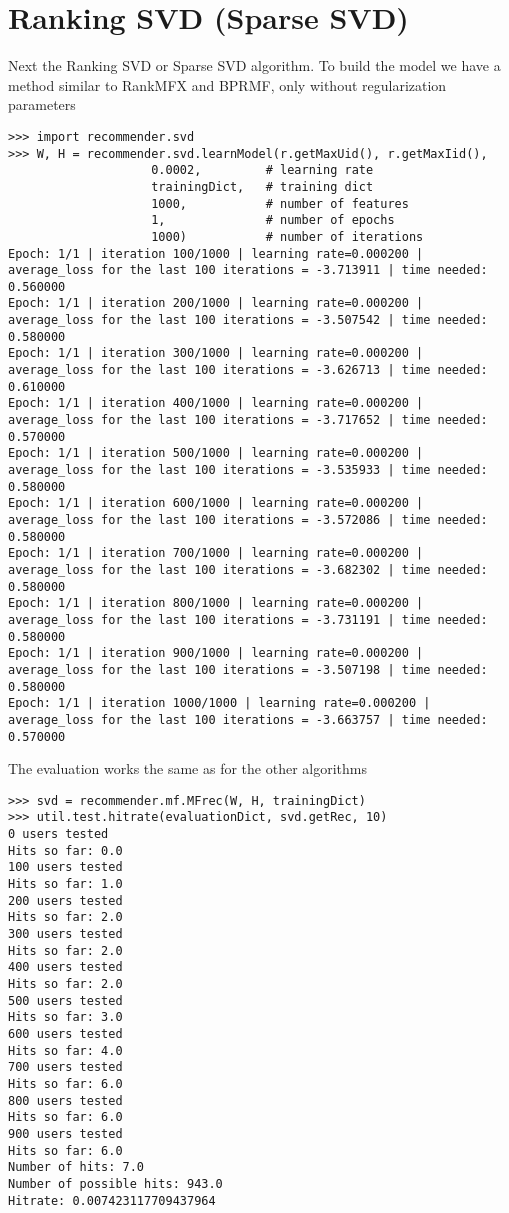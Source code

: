 \section{Ranking SVD (Sparse SVD)}
Next the Ranking SVD or Sparse SVD algorithm. To build the model we have 
a method similar to RankMFX and BPRMF, only without regularization parameters
\begin{lstlisting}
>>> import recommender.svd
>>> W, H = recommender.svd.learnModel(r.getMaxUid(), r.getMaxIid(),
                    0.0002,         # learning rate
                    trainingDict,   # training dict
                    1000,           # number of features
                    1,              # number of epochs
                    1000)           # number of iterations
Epoch: 1/1 | iteration 100/1000 | learning rate=0.000200 | average_loss for the last 100 iterations = -3.713911 | time needed: 0.560000
Epoch: 1/1 | iteration 200/1000 | learning rate=0.000200 | average_loss for the last 100 iterations = -3.507542 | time needed: 0.580000
Epoch: 1/1 | iteration 300/1000 | learning rate=0.000200 | average_loss for the last 100 iterations = -3.626713 | time needed: 0.610000
Epoch: 1/1 | iteration 400/1000 | learning rate=0.000200 | average_loss for the last 100 iterations = -3.717652 | time needed: 0.570000
Epoch: 1/1 | iteration 500/1000 | learning rate=0.000200 | average_loss for the last 100 iterations = -3.535933 | time needed: 0.580000
Epoch: 1/1 | iteration 600/1000 | learning rate=0.000200 | average_loss for the last 100 iterations = -3.572086 | time needed: 0.580000
Epoch: 1/1 | iteration 700/1000 | learning rate=0.000200 | average_loss for the last 100 iterations = -3.682302 | time needed: 0.580000
Epoch: 1/1 | iteration 800/1000 | learning rate=0.000200 | average_loss for the last 100 iterations = -3.731191 | time needed: 0.580000
Epoch: 1/1 | iteration 900/1000 | learning rate=0.000200 | average_loss for the last 100 iterations = -3.507198 | time needed: 0.580000
Epoch: 1/1 | iteration 1000/1000 | learning rate=0.000200 | average_loss for the last 100 iterations = -3.663757 | time needed: 0.570000
\end{lstlisting}
The evaluation works the same as for the other algorithms
\begin{lstlisting}
>>> svd = recommender.mf.MFrec(W, H, trainingDict)
>>> util.test.hitrate(evaluationDict, svd.getRec, 10)
0 users tested
Hits so far: 0.0
100 users tested
Hits so far: 1.0
200 users tested
Hits so far: 2.0
300 users tested
Hits so far: 2.0
400 users tested
Hits so far: 2.0
500 users tested
Hits so far: 3.0
600 users tested
Hits so far: 4.0
700 users tested
Hits so far: 6.0
800 users tested
Hits so far: 6.0
900 users tested
Hits so far: 6.0
Number of hits: 7.0
Number of possible hits: 943.0
Hitrate: 0.007423117709437964
\end{lstlisting}

